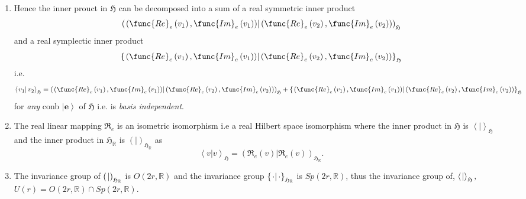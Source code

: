 \documentclass[aps,preprint]{revtex4}
\newtheorem{remark}[theorem]{Remark}
\begin{document}
\begin{enumerate}
\begin{remark}
are \emph{basis} \emph{independent i.e. these equalities are true for all }$%
\left\vert \mathbf{e}\right\rangle $\emph{.}
\end{remark}

\item Hence the inner prouct in $\mathfrak{H}$ can be decomposed into a sum
of a real symmetric inner product 
\begin{equation}
\left( \left. \left( \func{Re}_{e}\left( v_{1}\right) ,\func{Im}_{e}\left(
v_{1}\right) \right) \right\vert \left( \func{Re}_{e}\left( v_{2}\right) ,%
\func{Im}_{e}\left( v_{2}\right) \right) \right) _{\mathfrak{H}}
\end{equation}%
and a real symplectic inner product 
\begin{equation}
\left\{ \left. \left( \func{Re}_{e}\left( v_{1}\right) ,\func{Im}_{e}\left(
v_{1}\right) \right) \right\vert \left( \func{Re}_{e}\left( v_{2}\right) ,%
\func{Im}_{e}\left( v_{2}\right) \right) \right\} _{\mathfrak{H}}
\end{equation}%
i.e.%
\begin{equation}
\left\langle \left. v_{1}\right\vert v_{2}\right\rangle _{\mathfrak{H}%
}=\left( \left. \left( \func{Re}_{e}\left( v_{1}\right) ,\func{Im}_{e}\left(
v_{1}\right) \right) \right\vert \left( \func{Re}_{e}\left( v_{2}\right) ,%
\func{Im}_{e}\left( v_{2}\right) \right) \right) _{\mathfrak{H}}+\left\{
\left. \left( \func{Re}_{e}\left( v_{1}\right) ,\func{Im}_{e}\left(
v_{1}\right) \right) \right\vert \left( \func{Re}_{e}\left( v_{2}\right) ,%
\func{Im}_{e}\left( v_{2}\right) \right) \right\} _{\mathfrak{H}}
\end{equation}%
for \emph{any} conb $\left\vert \mathbf{e}\right\rangle $ of $\mathfrak{H}$
i.e. is \emph{basis independent}$\mathfrak{.}$

\item The real linear mapping $\mathfrak{R}_{e}$ is an isometric isomorphism
i.e a real Hilbert space isomorphism where the inner product in $\mathfrak{H}
$ is $\left\langle \left. {}\right\vert \right\rangle _{\mathfrak{H}}$ and
the inner product in $\mathfrak{H}_{\mathbb{R}}$ is $\left( \left.
{}\right\vert \right) _{\mathfrak{H}_{\mathbb{R}}}$ as 
\begin{equation}
\left\langle \left. v\right\vert v\right\rangle _{\mathfrak{H}}=\left(
\left. \mathfrak{R}_{e}\left( v\right) \right\vert \mathfrak{R}_{e}\left(
v\right) \right) _{\mathfrak{H}_{\mathbb{R}}}.
\end{equation}

\item The invariance group of $\left( \left. {}\right\vert \right) _{%
\mathfrak{H}_{\mathbb{R}}}$ is $O\left( 2r,\mathbb{R}\right) $ and the
invariance group $\left\{ \left. \cdot \right\vert \cdot \right\} _{%
\mathfrak{H}_{\mathbb{R}}}$ is $Sp\left( 2r,\mathbb{R}\right) $, thus the
invariance group of, $\left\langle \left. {}\right\vert \right\rangle _{%
\mathfrak{H}},$ $U\left( r\right) =O\left( 2r,\mathbb{R}\right) \cap
Sp\left( 2r,\mathbb{R}\right) .$


\end{enumerate}
\end{document}
